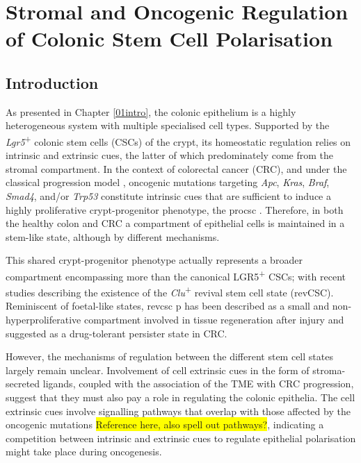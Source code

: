\chapter{Stromal and Oncogenic Regulation of Colonic Stem Cell Polarisation}
\label{04seq}

\section{Introduction}


As presented in Chapter \ref{01intro}, the colonic epithelium is a highly heterogeneous system with multiple specialised cell types. Supported by the \emph{Lgr5}\textsuperscript{+} colonic stem cells (CSCs) of the crypt, its homeostatic regulation relies on intrinsic and extrinsic cues, the latter of which predominately come from the stromal compartment. In the context of colorectal cancer (CRC), and under the classical progression model \cite{fearon_genetic_1990}, oncogenic mutations targeting \textit{Apc}, \textit{Kras}, \textit{Braf}, \textit{Smad4}, and/or \textit{Trp53} constitute intrinsic cues that are sufficient to induce a highly proliferative crypt-progenitor phenotype, the \acrfull{procsc} \cite{van_de_wetering_-catenintcf-4_2002}.
Therefore, in both the healthy colon and CRC a compartment of epithelial cells is maintained in a stem-like state, although by different mechanisms. 

This shared crypt-progenitor phenotype actually represents a broader compartment encompassing more than the canonical LGR5\textsuperscript{+} CSCs; with recent studies describing the existence of the \emph{Clu}\textsuperscript{+} revival stem cell state (revCSC). Reminiscent of foetal-like states, \acrshort{revcsc} p has been described as a small and non-hyperproliferative compartment involved in tissue regeneration after injury and suggested as a drug-tolerant persister state in CRC. 

However, the mechanisms of regulation between the different stem cell states largely remain unclear.
Involvement of cell extrinsic cues in the form of stroma-secreted ligands, coupled with the association of the TME with CRC progression, suggest that they must also pay a role in regulating the colonic epithelia. The cell extrinsic cues involve signalling pathways that overlap with those affected by the oncogenic mutations \colorbox{yellow}{Reference here\cite{sphyris_subversion_2021}, also spell out pathways?}, indicating a competition between intrinsic and extrinsic cues to regulate epithelial polarisation might take place during oncogenesis.

